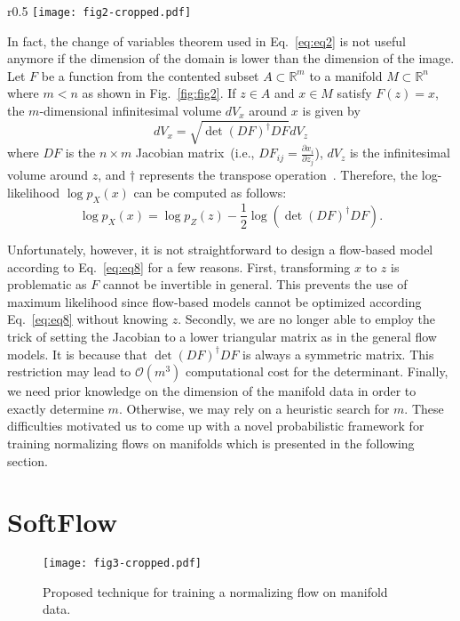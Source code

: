 \documentclass{article}
\begin{document}
\begin{wrapfigure}{r}{0.5\textwidth}
\vskip -7pt
\texttt{[image: fig2-cropped.pdf]} 
\caption{Example of the function that maps the contented subset of $\mathbb{R}^{m}$ to the manifold of $\mathbb{R}^{n}$.}
\label{fig:fig2}
\end{wrapfigure}
In fact, the change of variables theorem used in Eq.~\eqref{eq:eq2} is not useful anymore if the dimension of the domain is lower than the dimension of the image. Let $F$ be a function from the contented subset $A \subset \mathbb{R}^{m}$ to a manifold $M \subset \mathbb{R}^{n}$ where $m < n$ as shown in Fig.~\ref{fig:fig2}. If ${z} \in A$ and ${x} \in M$ satisfy $F({z})={x}$, the $m$-dimensional infinitesimal volume $dV_{x}$ around ${x}$ is given by
\begin{equation}
\label{eq:eq7}
dV_{x}= \sqrt{\det(DF)^{\dagger}DF} dV_{z}
\end{equation}
where $DF$ is the $n \times m$ Jacobian matrix~(i.e., $DF_{ij} = \frac{\partial {x}_{i}}{\partial {z}_{j}}$), $dV_{z}$ is the infinitesimal volume around ${z}$, and $\dagger$ represents the transpose operation~\citep{gemici2016normalizing, ben1999change}. Therefore, the log-likelihood $\log p_{X}({x})$ can be computed as follows:
\begin{equation}
\label{eq:eq8}
\log p_{X}({x}) = \log p_{Z}({z}) - \frac{1}{2}\log(\det(DF)^{\dagger}DF).
\end{equation}

Unfortunately, however, it is not straightforward to design a flow-based model according to Eq.~\eqref{eq:eq8} for a few reasons. First, transforming ${x}$ to ${z}$ is problematic as $F$ cannot be invertible in general. This prevents the use of maximum likelihood since flow-based models cannot be optimized according Eq.~\eqref{eq:eq8} without knowing $z$. Secondly, we are no longer able to employ the trick of setting the Jacobian to a lower triangular matrix as in the general flow models. It is because that $\det(DF)^{\dagger}DF$ is always a symmetric matrix. This restriction may lead to $\mathcal{O}(m^{3})$ computational cost for the determinant. Finally, we need prior knowledge on the dimension of the manifold data in order to exactly determine $m$. Otherwise, we may rely on a heuristic search for $m$. These difficulties motivated us to come up with a novel probabilistic framework for training normalizing flows on manifolds which is presented in the following section.


\section{SoftFlow}
\begin{figure}[t]
	\centering
	\texttt{[image: fig3-cropped.pdf]}
    \caption{Proposed technique for training a normalizing flow on manifold data.}
	\label{fig:fig3}
\end{figure}
\end{document}
